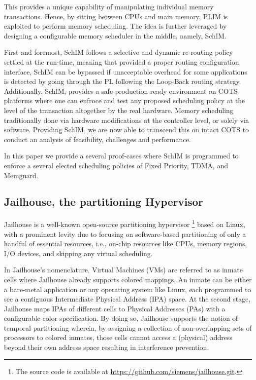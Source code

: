 This provides a unique capability of manipulating individual memory
transactions. Hence, by sitting between CPUs and main memory, PLIM is
exploited to perform memory scheduling. The idea is further leveraged
by designing a configurable memory scheduler in the middle, namely,
SchIM.

First and foremost, SchIM follows a selective and dynamic re-routing
policy settled at the run-time, meaning that provided a proper routing
configuration interface, SchIM can be bypassed if unacceptable
overhead for some applications is detected by going through the PL
following the Loop-Back routing strategy. Additionally, SchIM,
provides a safe production-ready environment on COTS platforms where
one can enfroce and test any proposed scheduling policy at the level
of the transaction altogether by the real hardware. Memory scheduling
traditionally done via hardware modifications at the controller level,
or solely via software. Providing SchIM, we are now able to transcend
this on intact COTS to conduct an analysis of feasibility, challenges
and performance.

In this paper we provide a several proof-cases where SchIM is
programmed to enforce a several elected scheduling policies of Fixed
Priority, TDMA, and Memguard.


\subsection{Jailhouse, the partitioning Hypervisor}
Jailhouse is a well-known open-source partitioning
hypervisor \footnote{The source code is available at
  \url{https://github.com/siemens/jailhouse.git}.} based on Linux,
with a prominent levity due to focusing on software-based partitioning
of only a handful of essential resources, i.e., on-chip resources like
CPUs, memory regions, I/O devices, and skipping any virtual
scheduling.

In Jailhouse's nomenclature, Virtual Machines (VMs) are referred to as
inmate cells where Jailhouse already supports colored mappings. An
inmate can be either a bare-metal application or any operating system
like Linux, each programmed to see a contiguous Intermediate Physical
Address (IPA) space. At the second stage, Jailhouse maps IPAs of
different cells to Physical Addresses (PAs) with a configurable color
specification. By doing so, Jailhouse supports the notion of temporal
partitioning wherein, by assigning a collection of non-overlapping
sets of processors to colored inmates, those cells cannot access a
(physical) address beyond their own address space resulting in
interference prevention.

